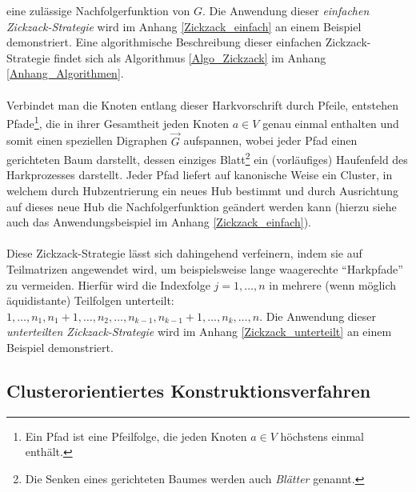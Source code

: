 \documentclass[fontsize=12pt,doubleside,openany,listof=totoc,listof=flat,listof=nochaptergap,numbers=noenddot]{scrbook}
\theoremstyle{style}
\begin{document}
\noindent eine zulässige Nachfolgerfunktion von $G$. Die Anwendung dieser \textit{einfachen Zickzack-Strategie} wird im Anhang \ref{Zickzack_einfach} 
an einem Beispiel demonstriert. Eine algorithmische Beschreibung dieser einfachen Zickzack-Strategie findet sich als Algorithmus \ref{Algo_Zickzack} im Anhang \ref{Anhang_Algorithmen}. \\
\\
Verbindet man die Knoten entlang dieser Harkvorschrift durch Pfeile, entstehen Pfade\footnote{Ein Pfad ist eine Pfeilfolge, die jeden Knoten $a \in V$ höchstens einmal enthält.}, die in ihrer Gesamtheit jeden Knoten $a \in V$ genau einmal enthalten und somit einen speziellen Digraphen $\vec{G}$ aufspannen, wobei jeder Pfad einen gerichteten Baum darstellt, dessen einziges Blatt\footnote{Die Senken eines gerichteten Baumes werden auch \textit{Blätter} genannt.} ein (vorläufiges) Haufenfeld des Harkprozesses darstellt. Jeder Pfad liefert auf kanonische Weise ein Cluster, in welchem durch Hubzentrierung ein neues Hub bestimmt und durch Ausrichtung auf dieses neue Hub die Nachfolgerfunktion geändert werden kann (hierzu siehe auch das Anwendungsbeispiel im Anhang \ref{Zickzack_einfach}).\\
\\
Diese Zickzack-Strategie lässt sich dahingehend verfeinern, indem sie auf Teilmatrizen angewendet wird, um beispielsweise lange waagerechte "`Harkpfade"' zu vermeiden. Hierfür wird die Indexfolge $j=1,\dots,n$ in mehrere (wenn möglich äquidistante) Teilfolgen unterteilt: $1,\dots,n_1,n_1+1,\dots,n_2,\dots,n_{k-1},n_{k-1}+1,\dots,n_k,\dots,n$. 
Die Anwendung dieser \textit{unterteilten Zickzack-Strategie} wird im Anhang \ref{Zickzack_unterteilt} an einem Beispiel demonstriert.


\subsection{Clusterorientiertes Konstruktionsverfahren}
\label{section_Clusterorientiertes_Konstruktionsverfahren}
\end{document}
